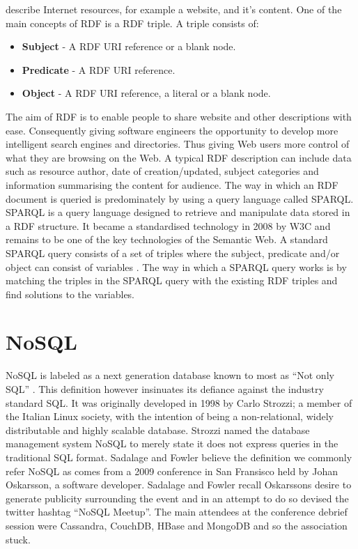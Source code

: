 describe Internet resources, for example a website, and it's content. One of the main concepts of RDF is a RDF triple. A triple consists of:

\begin{itemize}
\item \textbf{Subject} - A RDF URI reference or a blank node.
\item \textbf{Predicate} - A RDF URI reference.
\item \textbf{Object} - A RDF URI reference, a literal or a blank node.
\end{itemize}

The aim of RDF is to enable people to share website and other descriptions with ease. Consequently giving software engineers the opportunity to develop more intelligent search engines and directories. Thus giving Web users more control of what they are browsing on the Web. A typical RDF description can include data such as resource author, date of creation/updated, subject categories and information summarising the content for audience. The way in which an RDF document is queried is predominately by using a query language called SPARQL. SPARQL is a query language designed to retrieve and manipulate data stored in a RDF structure. It became a standardised technology in 2008 by W3C and remains to be one of the key technologies of the Semantic Web. A standard SPARQL query consists of a set of triples where the subject, predicate and/or object can consist of variables \cite{7}. The way in which a SPARQL query works is by matching the triples in the SPARQL query with the existing RDF triples and find solutions to the variables.

\section{NoSQL}\label{nosql}
NoSQL is labeled as a next generation database known to most as ``Not only SQL'' \cite{nosql1}. This definition however insinuates its defiance against the industry standard SQL. It was originally developed in 1998 by Carlo Strozzi; a member of the Italian Linux society, with the intention of being a non-relational, widely distributable and highly scalable database. Strozzi named the database management system NoSQL to merely state it does not express queries in the traditional SQL format. Sadalage and Fowler believe the definition we commonly refer NoSQL as comes from a 2009 conference in San Fransisco held by Johan Oskarsson, a software developer. Sadalage and Fowler recall Oskarssons desire to generate publicity surrounding the event and in an attempt to do so devised the twitter hashtag ``NoSQL Meetup''. The main attendees at the conference debrief session were Cassandra, CouchDB, HBase and MongoDB and so the association stuck. \cite{nosql1}

